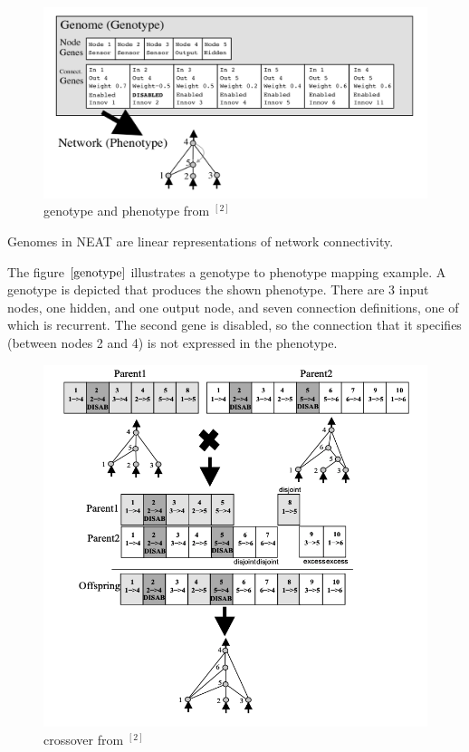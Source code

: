 \documentclass{article}
\begin{document}
\begin{figure}[htbp]
  \centering
  \includegraphics[width = .8\textwidth]{genome}
  \caption{genotype and phenotype from $^{[2]}$}
  \label{genotype}
\end{figure}

Genomes in NEAT are linear representations of network connectivity. 

The figure $\ref{genotype}$ illustrates a genotype to phenotype mapping example. A genotype is depicted that produces the shown phenotype. There are 3 input nodes, one hidden, and one output node, and seven connection definitions,
 one of which is recurrent. The second gene is disabled, so the connection that it specifies (between nodes 2 and 4) is not expressed in the phenotype.

 \begin{figure}[htbp]
  \centering
  \includegraphics[width = .8\textwidth]{crossover}
  \caption{crossover from $^{[2]}$}
  \label{crossover}
\end{figure}
\end{document}
